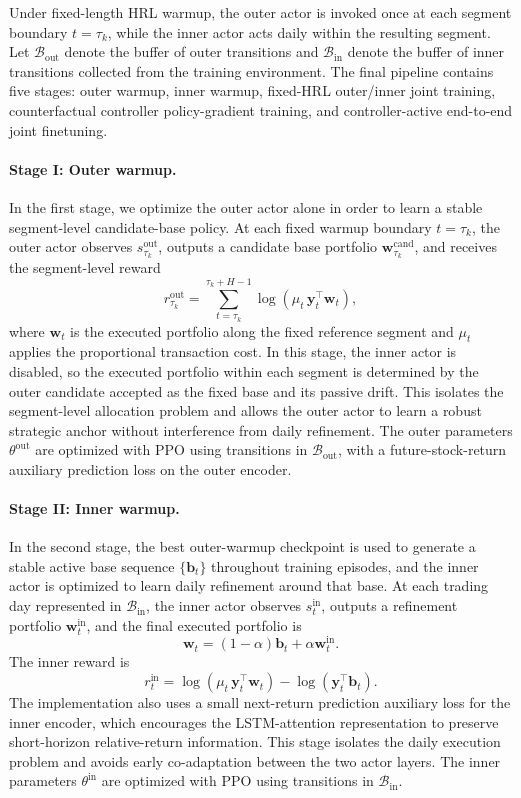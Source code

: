 \documentclass[letterpaper]{article} %
\begin{document}
Under fixed-length HRL warmup, the outer actor is invoked once at each segment boundary \(t=\tau_k\), while the inner actor acts daily within the resulting segment. Let \(\mathcal{B}_{\mathrm{out}}\) denote the buffer of outer transitions and \(\mathcal{B}_{\mathrm{in}}\) denote the buffer of inner transitions collected from the training environment. The final pipeline contains five stages: outer warmup, inner warmup, fixed-HRL outer/inner joint training, counterfactual controller policy-gradient training, and controller-active end-to-end joint finetuning.

\paragraph{Stage I: Outer warmup.}
In the first stage, we optimize the outer actor alone in order to learn a stable segment-level candidate-base policy. At each fixed warmup boundary \(t=\tau_k\), the outer actor observes \(s_{\tau_k}^{\mathrm{out}}\), outputs a candidate base portfolio \(\mathbf{w}^{\mathrm{cand}}_{\tau_k}\), and receives the segment-level reward
\[
r_{\tau_k}^{\mathrm{out}}
=
\sum_{t=\tau_k}^{\tau_k+H-1}
\log\!\left(\mu_t\,\mathbf{y}_t^\top\mathbf{w}_t\right),
\]
where \(\mathbf{w}_t\) is the executed portfolio along the fixed reference segment and \(\mu_t\) applies the proportional transaction cost. In this stage, the inner actor is disabled, so the executed portfolio within each segment is determined by the outer candidate accepted as the fixed base and its passive drift. This isolates the segment-level allocation problem and allows the outer actor to learn a robust strategic anchor without interference from daily refinement. The outer parameters \(\theta^{\mathrm{out}}\) are optimized with PPO using transitions in \(\mathcal{B}_{\mathrm{out}}\), with a future-stock-return auxiliary prediction loss on the outer encoder.

\paragraph{Stage II: Inner warmup.}
In the second stage, the best outer-warmup checkpoint is used to generate a stable active base sequence \(\{\mathbf{b}_t\}\) throughout training episodes, and the inner actor is optimized to learn daily refinement around that base. At each trading day represented in \(\mathcal{B}_{\mathrm{in}}\), the inner actor observes \(s_t^{\mathrm{in}}\), outputs a refinement portfolio \(\mathbf{w}_t^{\mathrm{in}}\), and the final executed portfolio is
\[
\mathbf{w}_t
=
(1-\alpha)\mathbf{b}_t
+
\alpha \mathbf{w}_t^{\mathrm{in}}.
\]
The inner reward is
\[
r_t^{\mathrm{in}}
=
\log\!\left(\mu_t\,\mathbf{y}_t^\top \mathbf{w}_t\right)
-
\log\!\left(\mathbf{y}_t^\top \mathbf{b}_t\right).
\]
The implementation also uses a small next-return prediction auxiliary loss for the inner encoder, which encourages the LSTM-attention representation to preserve short-horizon relative-return information. This stage isolates the daily execution problem and avoids early co-adaptation between the two actor layers. The inner parameters \(\theta^{\mathrm{in}}\) are optimized with PPO using transitions in \(\mathcal{B}_{\mathrm{in}}\).
\end{document}
